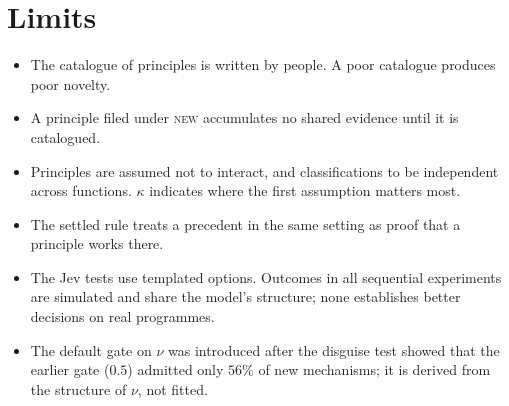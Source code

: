 \documentclass[11pt]{article}
\begin{document}
\section{Limits}

\begin{itemize}
\item The catalogue of principles is written by people. A poor catalogue produces poor novelty.
\item A principle filed under \textsc{new} accumulates no shared evidence until it is catalogued.
\item Principles are assumed not to interact, and classifications to be independent across
functions. $\kappa$ indicates where the first assumption matters most.
\item The settled rule treats a precedent in the same setting as proof that a principle works there.
\item The Jev tests use templated options. Outcomes in all sequential experiments are simulated
and share the model's structure; none establishes better decisions on real programmes.
\item The default gate on $\nu$ was introduced after the disguise test showed that the earlier gate
($0.5$) admitted only $56\%$ of new mechanisms; it is derived from the structure of $\nu$, not fitted.
\end{itemize}
\end{document}
